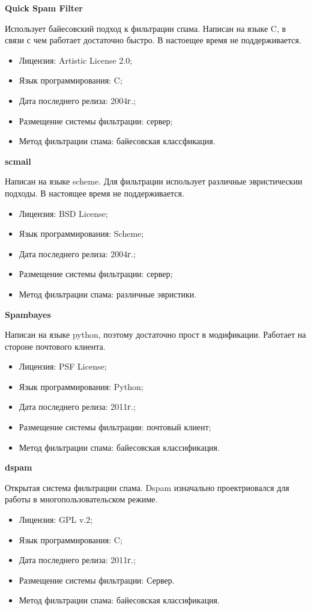 \textbf{Quick Spam Filter}

Использует байесовский подход к фильтрации спама. Написан на языке C, в связи с чем работает достаточно быстро. В настоещее время не поддерживается.
\begin{itemize}
\item Лицензия: Artistic License 2.0;
\item Язык программирования: C;
\item Дата последнего релиза: 2004г.;
\item Размещение системы фильтрации: сервер;
\item Метод фильтрации спама: байесовская классфикация.
\end{itemize}

\textbf{scmail}

Написан на языке scheme. Для фильтрации использует различные эвристическии подходы. В настоящее время не поддерживается.
\begin{itemize}
\item Лицензия: BSD License;
\item Язык программирования: Scheme;
\item Дата последнего релиза: 2004г.;
\item Размещение системы фильтрации: сервер;
\item Метод фильтрации спама: различные эвристики.
\end{itemize}

\textbf{Spambayes}

Написан на языке python, поэтому достаточно прост в модификации. Работает на стороне почтового клиента.

\begin{itemize}
\item Лицензия: PSF License;
\item Язык программирования: Python;
\item Дата последнего релиза: 2011г.;
\item Размещение системы фильтрации: почтовый клиент;
\item Метод фильтрации спама: байесовская классификация.
\end{itemize}



\textbf{dspam} 

Открытая система фильтрации спама. Dspam изначально проектриовался для работы в многопользовательском режиме.
\begin{itemize}
\item Лицензия: GPL v.2;
\item Язык программирования: C;
\item Дата последнего релиза: 2011г.;
\item Размещение системы фильтрации: Сервер.
\item Метод фильтрации спама: байесовская классификация.
\end{itemize}

